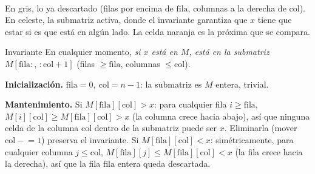 \documentclass[11pt]{article}
\begin{document}
\begin{center}
\\[10pt]
{\footnotesize En gris, lo ya descartado (filas por encima de $\mathrm{fila}$, columnas a la derecha de
$\mathrm{col}$). En celeste, la submatriz activa, donde el invariante garantiza que $x$ tiene que estar si
es que está en algún lado. La celda naranja es la próxima que se compara.}
\end{center}

\begin{resultado}{Invariante}
En cualquier momento, \emph{si $x$ está en $M$, está en la submatriz $M[\mathrm{fila}:,\,:\mathrm{col}{+}1]$}
(filas $\ge\mathrm{fila}$, columnas $\le\mathrm{col}$).
\end{resultado}

\textbf{Inicialización.} $\mathrm{fila}=0,\ \mathrm{col}=n{-}1$: la submatriz es $M$ entera, trivial.

\textbf{Mantenimiento.} Si $M[\mathrm{fila}][\mathrm{col}]>x$: para cualquier fila $i\ge\mathrm{fila}$,
$M[i][\mathrm{col}]\ge M[\mathrm{fila}][\mathrm{col}]>x$ (la columna crece hacia abajo), así que ninguna
celda de la columna $\mathrm{col}$ dentro de la submatriz puede ser $x$. Eliminarla (mover
$\mathrm{col}\mathrel{-}=1$) preserva el invariante. Si $M[\mathrm{fila}][\mathrm{col}]<x$: simétricamente,
para cualquier columna $j\le\mathrm{col}$, $M[\mathrm{fila}][j]\le M[\mathrm{fila}][\mathrm{col}]<x$ (la fila
crece hacia la derecha), así que la fila $\mathrm{fila}$ entera queda descartada.
\end{document}

